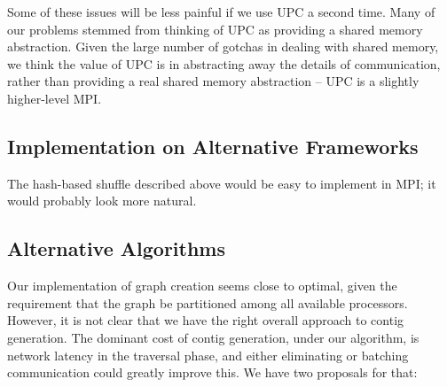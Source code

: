 \documentclass{article}
\begin{document}
Some of these issues will be less painful if we use UPC a second time.  Many of our problems stemmed from thinking of UPC as providing a shared memory abstraction.  Given the large number of gotchas in dealing with shared memory, we think the value of UPC is in abstracting away the details of communication, rather than providing a real shared memory abstraction -- UPC is a slightly higher-level MPI.

\subsection{Implementation on Alternative Frameworks}
The hash-based shuffle described above would be easy to implement in MPI; it would probably look more natural. %

\subsection{Alternative Algorithms}
Our implementation of graph creation seems close to optimal, given the requirement that the graph be partitioned among all available processors.  However, it is not clear that we have the right overall approach to contig generation.  The dominant cost of contig generation, under our algorithm, is network latency in the traversal phase, and either eliminating or batching communication could greatly improve this.  We have two proposals for that:
\end{document}
